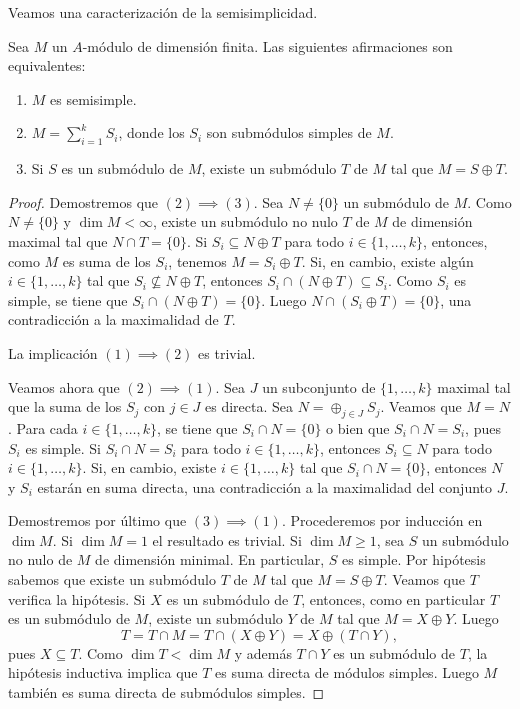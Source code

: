 Veamos una caracterización de la semisimplicidad.
 
\begin{proposition}
\label{pro:semisimple}
	Sea $M$ un $A$-módulo de dimensión finita. Las siguientes afirmaciones son equivalentes:
	\begin{enumerate}
		\item $M$ es semisimple.
		\item $M=\sum_{i=1}^k S_i$, donde los $S_i$ son submódulos simples de $M$.
		\item Si $S$ es un submódulo de $M$, existe un submódulo $T$ de $M$ tal que $M=S\oplus T$.    
	\end{enumerate}
\end{proposition}

\begin{proof}
	Demostremos que $(2)\implies(3)$.
	Sea $N\ne\{0\}$ un submódulo de $M$. Como $N\ne\{0\}$ y $\dim M<\infty$, existe
	un submódulo no nulo $T$ de $M$ de dimensión maximal
	tal que $N\cap T=\{0\}$. Si $S_i\subseteq N\oplus T$ para todo $i\in\{1,\dots,k\}$, entonces, como $M$ es suma de los $S_i$, tenemos $M=S_i\oplus T$. 
	Si, en cambio, existe algún $i\in\{1,\dots,k\}$ tal que $S_i\not\subseteq N\oplus T$, entonces $S_i\cap (N\oplus T)\subseteq S_i$. Como $S_i$ es simple,
	se tiene que $S_i\cap (N\oplus T)=\{0\}$. Luego $N\cap (S_i\oplus T)=\{0\}$, una contradicción a la maximalidad de $T$.  
	
	La implicación $(1)\implies(2)$ es trivial. 
	
	Veamos ahora que $(2)\implies(1)$. Sea $J$ un subconjunto de $\{1,\dots,k\}$ maximal tal que 
	la suma de los $S_j$ con $j\in J$ es directa. Sea $N=\oplus_{j\in J}S_j$. Veamos que $M=N$. 
	Para cada $i\in\{1,\dots,k\}$, se tiene que $S_i\cap N=\{0\}$ o bien que $S_i\cap N=S_i$, pues
	$S_i$ es simple. Si $S_i\cap N=S_i$ para todo $i\in\{1,\dots,k\}$, entonces $S_i\subseteq N$ para todo $i\in\{1,\dots,k\}$.  
	Si, en cambio, existe $i\in\{1,\dots,k\}$ tal que $S_i\cap N=\{0\}$, entonces $N$ y $S_i$ estarán en suma directa, 
	una contradicción a la maximalidad del conjunto $J$.
	
	Demostremos por último que $(3)\implies(1)$. 
	Procederemos por inducción en $\dim M$. Si $\dim M=1$ el resultado es trivial. Si $\dim M\geq1$, 
	sea $S$ un submódulo no nulo de $M$ de dimensión minimal. En particular, $S$ es simple. 
	Por hipótesis sabemos que existe un submódulo $T$ de $M$ tal que $M=S\oplus T$. Veamos que $T$ verifica la hipótesis. 
	Si $X$ es un submódulo de $T$, entonces, como en particular $T$ es un submódulo de $M$, existe un submódulo $Y$ de $M$ tal que
	$M=X\oplus Y$. Luego 
	\[
	T=T\cap M=T\cap (X\oplus Y)=X\oplus (T\cap Y),
	\]
	pues $X\subseteq T$. 
	Como $\dim T<\dim M$ y además $T\cap Y$ es un submódulo de $T$, la hipótesis inductiva 
	implica que $T$ es suma directa de módulos simples. Luego $M$ también es suma
	directa de submódulos simples. 
\end{proof}

